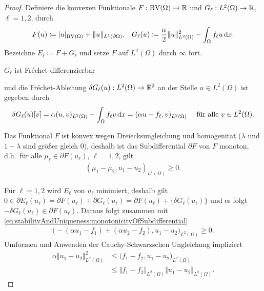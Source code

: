 \begin{proof}
  Definiere die konvexen Funktionale $F:\textup{BV}(\Omega)\to \mathbb{R}$ und 
  $G_\ell:L^2(\Omega)\to \mathbb{R}$, $\ell=1,2$, durch
  \begin{align*}
    F(u) &\coloneqq |u|_{\textup{BV}(\Omega)} + \Vert u \Vert_{L^1(\partial\Omega)},&
    G_\ell(u)\coloneqq \frac{\alpha}{2}\Vert u\Vert_{L^2(\Omega)}^2 -
    \int_\Omega f_\ell u\,\mathrm{d}x.
  \end{align*}
  Bezeichne $E_\ell\coloneqq F+G_\ell$ und setze $F$ auf $L^2(\Omega)$
  durch $\infty$ fort.

  $G_\ell$ ist Fr\'echet-differenzierbar 


  und die Fr\'echet-Ableitung $\delta G_\ell(u):L^2(\Omega)\to\mathbb{R}^2 $ an der
  Stelle
  $u\in L^2(\Omega)$ ist gegeben durch
  \begin{align*}
    \delta G_\ell(u)[v] = \alpha (u,v)_{L^2(\Omega)} - \int_\Omega f_\ell v\,\mathrm{d}x 
    = (\alpha u-f_\ell ,v)_{L^2(\Omega)} \quad 
    \text{ für alle } v\in L^2(\Omega).
  \end{align*}

  Das Funktional $F$ ist konvex {\color{red} wegen Dreiecksungleichung und 
  homogenität ($\lambda$ und $1-\lambda$ sind größer gleich 0)}, deshalb 
   ist das
  Subdifferential
  $\partial F$ von $F$ monoton, d.h.\ für alle $\mu_\ell\in \partial F(u_\ell)$,
  $\ell=1,2$, gilt
  \begin{align}\label{eq:stabilityAndUniqueness:monotonicityOfSubdifferential}
    (\mu_1-\mu_2,u_1-u_2)_{L^2(\Omega)}\geq 0.
  \end{align}

  Für $\ell=1,2$ wird $E_\ell$ von $u_\ell$ minimiert, 
  deshalb gilt $0\in\partial E_\ell(u_\ell)
  = \partial F(u_\ell)+\partial G_\ell(u_\ell)=\partial F(u_\ell)+
  \{\delta G_\ell(u_\ell)\}$  und es folgt
  $-\delta G_\ell(u_\ell)\in\partial F(u_\ell)$.
  Daraus folgt zusammen mit
  \eqref{eq:stabilityAndUniqueness:monotonicityOfSubdifferential}
  \begin{align*}
    \big( -(\alpha u_1 - f_1) + (\alpha u_2 - f_2), u_1 - u_2\big)_{L^2(\Omega)}
    \geq 0.
  \end{align*}
  Umformen und Anwenden der Cauchy-Schwarzschen Ungleichung impliziert
  \begin{align*}
    \alpha \Vert u_1 - u_2 \Vert_{L^2(\Omega)}^2
    &\leq
    \big(f_1 -f_2, u_1-u_2 \big)_{L^2(\Omega)}\\
    &\leq
    \Vert f_1-f_2\Vert_{L^2(\Omega)}\Vert u_1 - u_2\Vert_{L^2(\Omega)}.
  \end{align*}


\end{proof}
